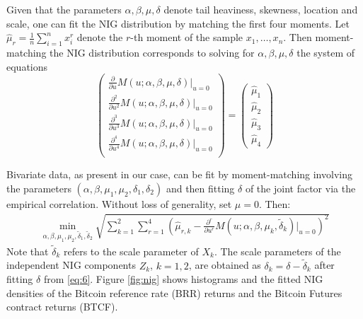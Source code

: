 Given that the parameters $\alpha, \beta, \mu, \delta$ denote tail
heaviness, skewness, location and scale, one can fit the NIG
distribution by matching the first four moments. Let
$\hat\mu_r=\frac{1}{n} \sum_{i=1}^n x_i^r$ denote the $r$-th moment of
the sample $x_1, \ldots, x_n$. Then moment-matching the NIG
distribution corresponds to solving for $\alpha, \beta, \mu, \delta$
the system of equations
\begin{equation*}
  \begin{pmatrix}
    \frac{\partial}{\partial u} M(u; \alpha, \beta, \mu,
    \delta)|_{u=0}\\[5pt]
    \frac{\partial^2}{\partial u^2} M(u; \alpha, \beta, \mu,
    \delta)|_{u=0}\\[5pt]
    \frac{\partial^3}{\partial u^3} M(u; \alpha, \beta, \mu,
    \delta)|_{u=0}\\[5pt]
    \frac{\partial^4}{\partial u^4} M(u; \alpha, \beta, \mu,
    \delta)|_{u=0}\\
  \end{pmatrix}
  =
  \begin{pmatrix}
    \hat\mu_1\\[5pt]
    \hat\mu_2\\[5pt]
    \hat\mu_3\\[5pt]
    \hat\mu_4
  \end{pmatrix}
\end{equation*}


Bivariate data, as present in our case, can be
fit by moment-matching involving the parameters $(\alpha, \beta,
\mu_1, \mu_2, \delta_1, \delta_2)$ and then fitting $\delta$ of the
joint factor via the empirical correlation. Without loss of
generality, set $\mu=0$. Then:
\begin{align*}
  \min_{\alpha, \beta, \mu_1, \mu_2, \tilde\delta_1, \tilde\delta_2}
  \sqrt{\sum_{k=1}^2 \sum_{r=1}^4
  \left(\hat\mu_{r,k}-\frac{\partial^r}{\partial u^r} M(u; \alpha, \beta,
  \mu_k, \tilde\delta_k)\Big|_{u=0}\right)^2}
\end{align*}
Note that $\tilde\delta_k$ refers to the scale parameter of
$X_k$. The scale parameters of the independent NIG components $Z_k$,
$k=1,2$, are obtained as $\delta_k=\delta-\tilde \delta_k$ after
fitting $\delta$ from \eqref{eq:6}. Figure \ref{fig:nig} shows
histograms and the fitted NIG densities of the Bitcoin reference rate
(BRR) returns and the Bitcoin Futures contract returns (BTCF). 


